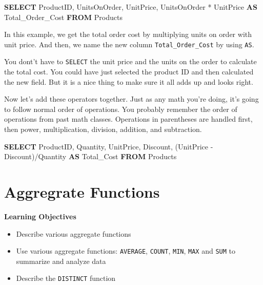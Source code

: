 \documentclass[]{book}
\newenvironment{Shaded}{\begin{snugshade}}{\end{snugshade}}
\newcommand{\KeywordTok}[1]{\textcolor[rgb]{0.13,0.29,0.53}{\textbf{{#1}}}}
\newcommand{\NormalTok}[1]{{#1}}
\providecommand{\tightlist}{%
  \setlength{\itemsep}{0pt}\setlength{\parskip}{0pt}}
\theoremstyle{definition}
\theoremstyle{definition}
\theoremstyle{remark}
\begin{document}
\begin{Shaded}
\begin{Highlighting}[]
\KeywordTok{SELECT} 
\NormalTok{ProductID,}
\NormalTok{UnitsOnOrder,}
\NormalTok{UnitPrice,}
\NormalTok{UnitsOnOrder * UnitPrice }\KeywordTok{AS} \NormalTok{Total_Order_Cost}
\KeywordTok{FROM} \NormalTok{Products}
\end{Highlighting}
\end{Shaded}

In this example, we get the total order cost by multiplying units on
order with unit price. And then, we name the new column
\texttt{Total\_Order\_Cost} by using \texttt{AS}.

You dont't have to \texttt{SELECT} the unit price and the units on the
order to calculate the total cost. You could have just selected the
product ID and then calculated the new field. But it is a nice thing to
make sure it all adds up and looks right.

Now let's add these operators together. Just as any math you're doing,
it's going to follow normal order of operations. You probably remember
the order of operations from past math classes. Operations in
parentheses are handled first, then power, multiplication, division,
addition, and subtraction.

\begin{Shaded}
\begin{Highlighting}[]
\KeywordTok{SELECT}
\NormalTok{ProductID,}
\NormalTok{Quantity,}
\NormalTok{UnitPrice,}
\NormalTok{Discount,}
\NormalTok{(UnitPrice - Discount)/Quantity }\KeywordTok{AS} \NormalTok{Total_Cost}
\KeywordTok{FROM} \NormalTok{Products}
\end{Highlighting}
\end{Shaded}

\section{Aggregrate Functions}\label{aggregrate-functions}

\textbf{Learning Objectives}

\begin{itemize}
\tightlist
\item
  Describe various aggregate functions
\item
  Use various aggregate functions: \texttt{AVERAGE}, \texttt{COUNT},
  \texttt{MIN}, \texttt{MAX} and \texttt{SUM} to summarize and analyze
  data
\item
  Describe the \texttt{DISTINCT} function
\end{itemize}
\end{document}
